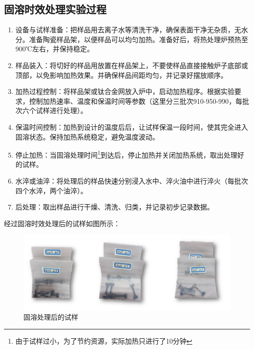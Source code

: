 

\subsection{固溶时效处理实验过程}
\begin{enumerate}
	\item 设备与试样准备：把样品用去离子水等清洗干净，确保表面干净无杂质，无水分。准备陶瓷样品架，以便样品可以均匀加热。准备好后，将热处理炉预热至900℃左右，并保持稳定。
	\item 样品装入：将切好的样品用放置在样品架上，不要使样品直接接触炉子底部或顶部，以免影响加热效果。并确保样品间距均匀，并记录好摆放顺序。
	\item 加热过程控制：将样品架或钛合金网放入炉中，启动加热程序。根据实验要求，控制加热速率、温度和保温时间等参数（这里分三批次{910-950-990}，每批次六个试样进行处理）。
	\item 保温时间控制：加热到设计的温度后后，让试样保温一段时间，使其完全进入固溶状态。保持加热系统稳定，避免温度波动。
	\item 停止加热：当固溶处理时间{\footnote{由于试样过小，为了节约资源，实际加热只进行了10分钟}}到达后，停止加热并关闭加热系统，取出处理好的试样。
	\item 水淬或油淬：将处理后的样品快速分别浸入水中、淬火油中进行淬火（每批次四个水淬，两个油淬）。
	\item 后处理：取出样品进行干燥、清洗、归类，并记录初步记录数据。
\end{enumerate}
经过固溶时效处理后的试样如图所示：

\begin{figure}[h!]
	\centering
	\includegraphics[width=0.7\linewidth]{pic/固溶处理后的试样}
	\caption{固溶处理后的试样}
	\label{fig: aftergurong}
\end{figure}

